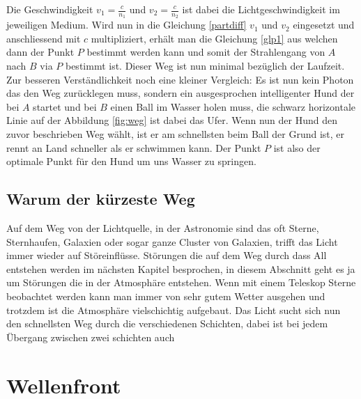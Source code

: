 \begin{refsection}
Die Geschwindigkeit $ v_{1} = \frac{c}{n_{1}} $ und $ v_{2} = \frac{c}{n_{2}}$ ist dabei die Lichtgeschwindigkeit im jeweiligen Medium. Wird nun in die Gleichung \eqref{partdiff} $ v_{1}$ und $ v_{2}$ eingesetzt und anschliessend mit $c$ multipliziert, erhält man die Gleichung \eqref{glp1} aus welchen dann der Punkt $P$ bestimmt werden kann und somit der Strahlengang von $A$ nach $B$ via $P$ bestimmt ist. Dieser Weg ist nun minimal bezüglich der Laufzeit. Zur besseren Verständlichkeit noch eine kleiner Vergleich:\newline
Es ist nun kein Photon das den Weg zurücklegen muss, sondern ein ausgesprochen intelligenter Hund der bei $A$ startet und bei $B$ einen Ball im Wasser holen muss, die schwarz horizontale Linie auf der Abbildung \ref{fig:weg} ist dabei das Ufer. Wenn nun der Hund den zuvor beschrieben Weg wählt, ist er am schnellsten beim Ball der Grund ist, er rennt an Land schneller als er schwimmen kann. Der Punkt $P$ ist also der optimale Punkt für den Hund um uns Wasser zu springen.

\subsection{Warum der kürzeste Weg}
Auf dem Weg von der Lichtquelle, in der Astronomie sind das oft Sterne, Sternhaufen, Galaxien oder sogar ganze Cluster von Galaxien, trifft das Licht immer wieder auf Störeinflüsse. Störungen die auf dem Weg durch dass All entstehen werden im nächsten Kapitel besprochen, in diesem Abschnitt geht es ja um Störungen die in der Atmosphäre entstehen. Wenn mit einem Teleskop Sterne beobachtet werden kann man immer von sehr gutem Wetter ausgehen und trotzdem ist die Atmosphäre vielschichtig aufgebaut. Das Licht sucht sich nun den schnellsten Weg durch die verschiedenen Schichten, dabei ist bei jedem Übergang zwischen zwei schichten auch  

\section{Wellenfront}


\printbibliography[heading=subbibliography]
\end{refsection}

